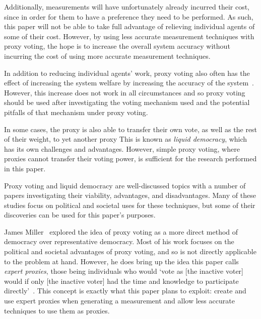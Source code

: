 Additionally, measurements will have unfortunately already incurred their cost, since in
order for them to have a preference they need to be performed.
As such, this paper will not be able to take full advantage of relieving individual
agents of some of their cost.
However, by using less accurate measurement techniques with proxy voting, the hope
is to increase the overall system accuracy without incurring the cost of using more
accurate measurement techniques.

In addition to reducing individual agents' work, proxy voting also often has
the effect of increasing the system welfare by increasing the accuracy of the
system~\cite[sec.~1.1]{Cohensius2017}.
However, this increase does not work in all circumstances and so proxy voting
should be used after investigating the voting mechanism used and the potential
pitfalls of that mechanism under proxy voting.

In some cases, the proxy is also able to transfer their own vote, as well as the rest of
their weight, to yet another proxy   
This is known as \textit{liquid democracy}, which has its own challenges and
advantages.
However, simple proxy voting, where proxies cannot transfer their voting power,
is sufficient for the research performed in this paper.

Proxy voting and liquid democracy are well-discussed topics with a number of
papers investigating their viability, advantages, and disadvantages.  
Many of these studies focus on political and societal uses for these techniques,
but some of their discoveries can be used for this paper's purposes.

James Miller~\cite{Miller1969} explored the idea of proxy voting as a more
direct method of democracy over representative democracy.
Most of his work focuses on the political and societal advantages of proxy
voting, and so is not directly applicable to the problem at hand.
However, he does bring up the idea this paper calls \textit{expert proxies},
those being individuals who would `vote as [the inactive voter] would if only
[the inactive voter] had the time and knowledge to participate
directly'~\cite[para.~1.3]{Miller1969}.
This concept is exactly what this paper plans to exploit: create and use expert
proxies when generating a measurement and allow less accurate techniques to use
them as proxies.

